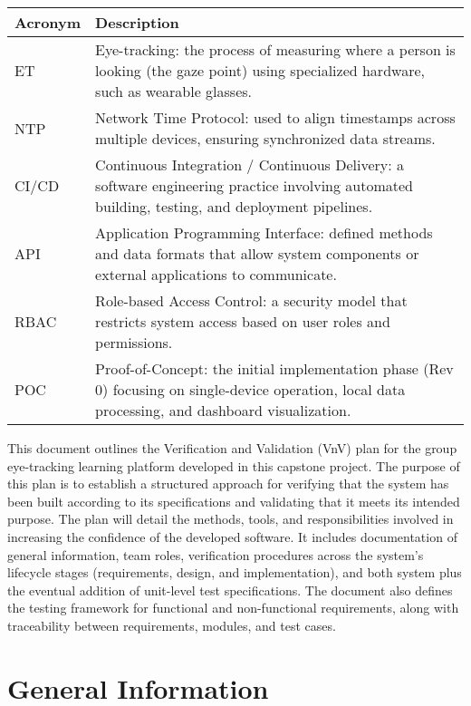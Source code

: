 \documentclass[12pt, titlepage]{article}
\begin{document}
\renewcommand{\arraystretch}{1.2}
\begin{tabular}{l p{10cm}} 
  \toprule		
  \textbf{Acronym} & \textbf{Description}\\
  \midrule 
  ET & Eye-tracking: the process of measuring where a person is looking (the gaze point) using specialized hardware, such as wearable glasses.\\
  NTP & Network Time Protocol: used to align timestamps across multiple devices, ensuring synchronized data streams.\\
  CI/CD & Continuous Integration / Continuous Delivery: a software engineering practice involving automated building, testing, and deployment pipelines.\\
  API & Application Programming Interface: defined methods and data formats that allow system components or external applications to communicate.\\
  RBAC & Role-based Access Control: a security model that restricts system access based on user roles and permissions.\\
  POC & Proof-of-Concept: the initial implementation phase (Rev 0) focusing on single-device operation, local data processing, and dashboard visualization.\\
  \bottomrule
\end{tabular}


\newpage


This document outlines the Verification and Validation (VnV) plan for the group eye-tracking learning platform developed in this capstone project. The purpose of this plan is to establish a structured approach for verifying that the system has been built according to its specifications and validating that it meets its intended purpose.
The plan will detail the methods, tools, and responsibilities involved in increasing the confidence of the developed software. It includes documentation of general information, team roles, verification procedures across the system’s lifecycle stages (requirements, design, and implementation), and both system plus the eventual addition of unit-level test specifications. The document also defines the testing framework for functional and non-functional requirements, along with traceability between requirements, modules, and test cases.

\section{General Information}
\end{document}
